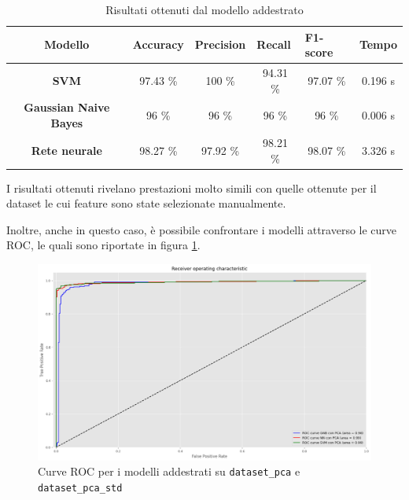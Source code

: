 \begin{table}[!ht]
    \centering
    \begin{tabular}{@{}clllll@{}}
        \toprule
        \rowcolor[HTML]{EFEFEF}
        \textbf{Modello}                                      & \textbf{Accuracy}            & \textbf{Precision}           & \textbf{Recall}              & \textbf{F1-score}            & \textbf{Tempo} \\ \midrule
        \cellcolor[HTML]{EFEFEF}\textbf{SVM}                  & \multicolumn{1}{c}{97.43 \%}     & \multicolumn{1}{c}{100 \%}     & \multicolumn{1}{c}{94.31 \%}     & \multicolumn{1}{c}{97.07 \%}     & \multicolumn{1}{c}{0.196 s}\\
        \cellcolor[HTML]{EFEFEF}\textbf{Gaussian Naive Bayes} & \multicolumn{1}{c}{96 \%}    & \multicolumn{1}{c}{96 \%}    & \multicolumn{1}{c}{96 \%}    & \multicolumn{1}{c}{96 \%}   & \multicolumn{1}{c}{0.006 s} \\
        \cellcolor[HTML]{EFEFEF}\textbf{Rete neurale}         & \multicolumn{1}{c}{98.27 \%} & \multicolumn{1}{c}{97.92 \%} & \multicolumn{1}{c}{98.21 \%} & \multicolumn{1}{c}{98.07 \%} & \multicolumn{1}{c}{3.326 s} \\ \bottomrule
    \end{tabular}
    \caption{Risultati ottenuti dal modello addestrato}
    \label{tab:risultati_pca}
\end{table}

I risultati ottenuti rivelano prestazioni molto simili con quelle ottenute per il
dataset le cui feature sono state selezionate manualmente.

Inoltre, anche in questo caso, è possibile confrontare i modelli attraverso le curve
ROC, le quali sono riportate in figura \ref{fig:roc_curve_pca}.
\begin{figure}[!ht]
    \centering
    \includegraphics[width=\textwidth]{img/ris/roc_curve_pca.png}
    \caption{Curve ROC per i modelli addestrati su \texttt{dataset\_pca} e \texttt{dataset\_pca\_std}}
    \label{fig:roc_curve_pca}
\end{figure}

